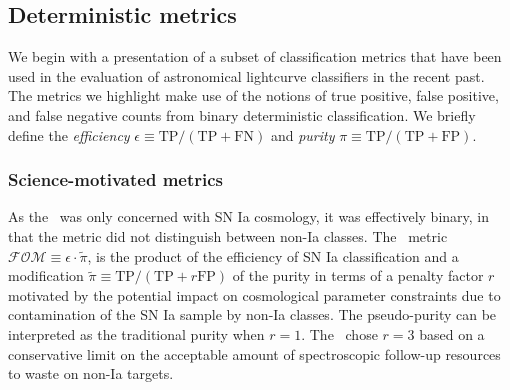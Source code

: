 \subsection{Deterministic metrics}
\label{sec:deterministic}

We begin with a presentation of a subset of classification metrics that have been used in the evaluation of astronomical lightcurve classifiers in the recent past.
The metrics we highlight make use of the notions of true positive, false positive, and false negative counts from binary deterministic classification.
We briefly define the \textit{efficiency} $\epsilon \equiv \mathrm{TP} / (\mathrm{TP} + \mathrm{FN})$ and \textit{purity} $\pi \equiv \mathrm{TP} / (\mathrm{TP} + \mathrm{FP})$.

\subsubsection{Science-motivated metrics}
\label{sec:science}

As the \snphotcc\ was only concerned with SN Ia cosmology, it was effectively binary, in that the metric did not distinguish between non-Ia classes.
The \snphotcc\ metric $\mathcal{FOM} \equiv \epsilon \cdot \tilde{\pi}$,
is the product of the efficiency
of SN Ia classification and a modification $\tilde{\pi} \equiv \mathrm{TP} / (\mathrm{TP} + r \mathrm{FP})$ of the purity in terms of a penalty factor $r$
motivated by the potential impact on cosmological parameter constraints due to contamination of the SN Ia sample by non-Ia classes.
The pseudo-purity can be interpreted as the traditional purity when $r = 1$.
The \snphotcc\ chose $r = 3$ based on a conservative limit on the acceptable amount of spectroscopic follow-up resources to waste on non-Ia targets.

